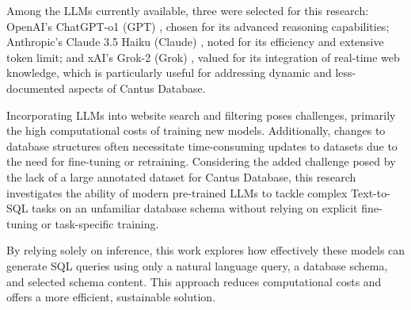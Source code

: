 Among the LLMs currently available, three were selected for this research: OpenAI's ChatGPT-o1 (GPT) \cite{openai2024chatgpt}, chosen for its advanced reasoning capabilities; Anthropic's Claude 3.5 Haiku (Claude) \cite{anthropic2023claude}, noted for its efficiency and extensive token limit; and xAI's Grok-2 (Grok) \cite{grok2}, valued for its integration of real-time web knowledge, which is particularly useful for addressing dynamic and less-documented aspects of Cantus Database.

Incorporating LLMs into website search and filtering poses challenges, primarily the high computational costs of training new models. Additionally, changes to database structures often necessitate time-consuming updates to datasets due to the need for fine-tuning or retraining. Considering the added challenge posed by the lack of a large annotated dataset for Cantus Database, this research investigates the ability of modern pre-trained LLMs to tackle complex Text-to-SQL tasks on an unfamiliar database schema without relying on explicit fine-tuning or task-specific training.

By relying solely on inference, this work explores how effectively these models can generate SQL queries using only a natural language query, a database schema, and selected schema content. This approach reduces computational costs and offers a more efficient, sustainable solution.